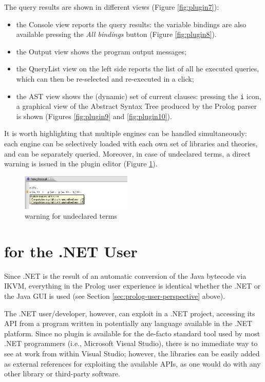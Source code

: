 The query results are shown in different views (Figure \ref{fig:plugin7}):
\begin{itemize}
  \item the \tuprolog{} Console view reports the query results: the variable bindings are also available pressing the \textit{All bindings} button (Figure \ref{fig:plugin8}).
  \item the Output view shows the program output messages;
  \item the QueryList view on the left side reports the list of all he executed queries, which can then be re-selected and re-executed in a click;
  \item the AST view shows the (dynamic) set of current clauses: pressing the \texttt{i} icon, a graphical view of the Abstract Syntax Tree produced by the Prolog parser is shown (Figures \ref{fig:plugin9} and \ref{fig:plugin10}).
\end{itemize}

It is worth highlighting that multiple \tuprolog{}  engines can be handled simultaneously: each engine can be selectively loaded with each own set of libraries and theories, and can be separately queried.
%
Moreover, in case of undeclared terms, a direct warning is issued in the plugin editor  (Figure \ref{fig:plugin11}).

\begin{figure}
  \includegraphics[width=200px]{images/plugin11.png}
  \caption{warning for undeclared terms}\label{fig:plugin11}
\end{figure}

\section{\tuprolog{} for the .NET User}
\label{sec:dotnet-user-perspective}

Since \tuprolog{}.NET is the result of an automatic conversion of the Java bytecode via IKVM\cite{ikvm}, everything in the Prolog user experience is identical whether the .NET or the Java GUI is used (see Section \ref{sec:prolog-user-perspective} above).

The .NET user/developer, however, can exploit \tuprolog{} in a .NET project, accessing its API from a program written in potentially any language available in the .NET platform.
%
Since no plugin is available for the de-facto standard tool used by most .NET programmers (i.e., Microsoft Visual Studio), there is no immediate way to see \tuprolog{} at work from within Visual Studio; however, the \tuprolog{} libraries can be easily added as external references for exploiting the available APIs, as one would do with any other library or third-party software.

